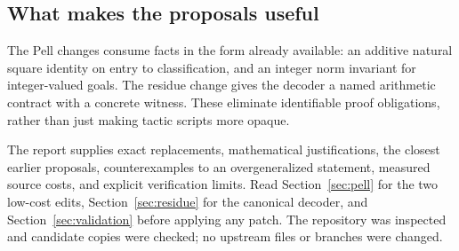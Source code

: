 \subsection{What makes the proposals useful}
The Pell changes consume facts in the form already available: an additive natural square identity on entry to classification, and an integer norm invariant for integer-valued goals. The residue change gives the decoder a named arithmetic contract with a concrete witness. These eliminate identifiable proof obligations, rather than just making tactic scripts more opaque.

The report supplies exact replacements, mathematical justifications, the closest earlier proposals, counterexamples to an overgeneralized statement, measured source costs, and explicit verification limits. Read Section~\ref{sec:pell} for the two low-cost edits, Section~\ref{sec:residue} for the canonical decoder, and Section~\ref{sec:validation} before applying any patch. The repository was inspected and candidate copies were checked; no upstream files or branches were changed.
